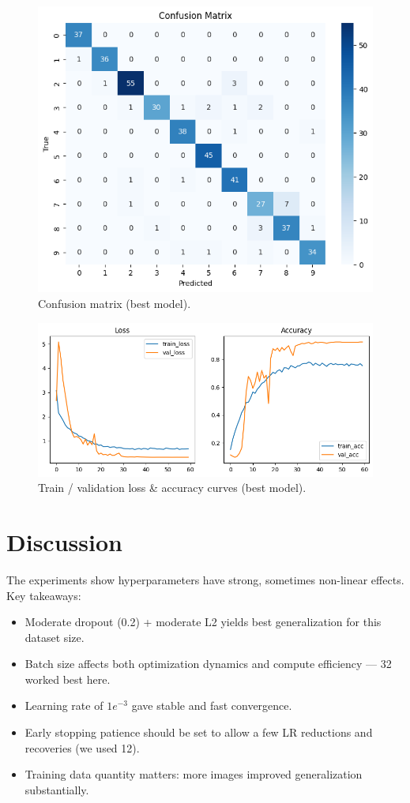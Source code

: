 \documentclass[conference]{IEEEtran}
\begin{document}
\begin{figure}[htbp]
  \centering
  \includegraphics[width=\columnwidth]{confusion_matrix.png}%
  \caption{Confusion matrix (best model).}
  \label{fig:cm}
\end{figure}

\begin{figure}[htbp]
  \centering
  \includegraphics[width=\columnwidth]{train_history.png}%
  \caption{Train / validation loss \& accuracy curves (best model).}
  \label{fig:history}
\end{figure}

\section{Discussion}
The experiments show hyperparameters have strong, sometimes non-linear effects. Key takeaways:
\begin{itemize}
  \item Moderate dropout (0.2) + moderate L2 yields best generalization for this dataset size.
  \item Batch size affects both optimization dynamics and compute efficiency — 32 worked best here.
  \item Learning rate of $1e^{-3}$ gave stable and fast convergence.
  \item Early stopping patience should be set to allow a few LR reductions and recoveries (we used 12).
  \item Training data quantity matters: more images improved generalization substantially.
\end{itemize}
\end{document}
